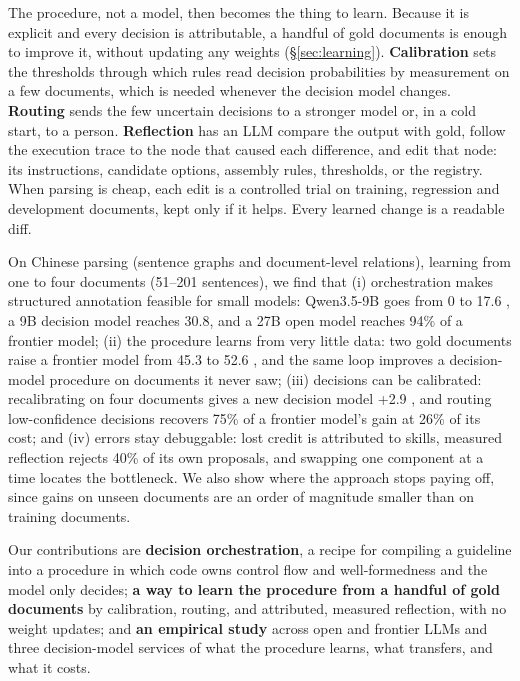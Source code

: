 The procedure, not a model, then becomes the thing to learn. Because it is explicit and every decision is attributable, a handful of gold documents is enough to improve it, without updating any weights (\S\ref{sec:learning}). \textbf{Calibration} sets the thresholds through which rules read decision probabilities by measurement on a few documents, which is needed whenever the decision model changes. \textbf{Routing} sends the few uncertain decisions to a stronger model or, in a cold start, to a person. \textbf{Reflection} has an LLM compare the output with gold, follow the execution trace to the node that caused each difference, and edit that node: its instructions, candidate options, assembly rules, thresholds, or the registry. When parsing is cheap, each edit is a controlled trial on training, regression and development documents, kept only if it helps. Every learned change is a readable diff.

On Chinese \umr parsing (sentence graphs and document-level relations), learning from one to four documents (51--201 sentences), we find that (i) orchestration makes structured annotation feasible for small models: Qwen3.5-9B goes from 0 to 17.6 \F, a 9B decision model reaches 30.8, and a 27B open model reaches 94\% of a frontier model; (ii) the procedure learns from very little data: two gold documents raise a frontier model from 45.3 to 52.6 \F, and the same loop improves a decision-model procedure on documents it never saw; (iii) decisions can be calibrated: recalibrating on four documents gives a new decision model +2.9 \F, and routing low-confidence decisions recovers 75\% of a frontier model's gain at 26\% of its cost; and (iv) errors stay debuggable: lost credit is attributed to skills, measured reflection rejects 40\% of its own proposals, and swapping one component at a time locates the bottleneck. We also show where the approach stops paying off, since gains on unseen documents are an order of magnitude smaller than on training documents. 

Our contributions are \textbf{decision orchestration}, a recipe for compiling a guideline into a procedure in which code owns control flow and well-formedness and the model only decides; \textbf{a way to learn the procedure from a handful of gold documents} by calibration, routing, and attributed, measured reflection, with no weight updates; and \textbf{an empirical study} across open and frontier LLMs and three decision-model services of what the procedure learns, what transfers, and what it costs.

